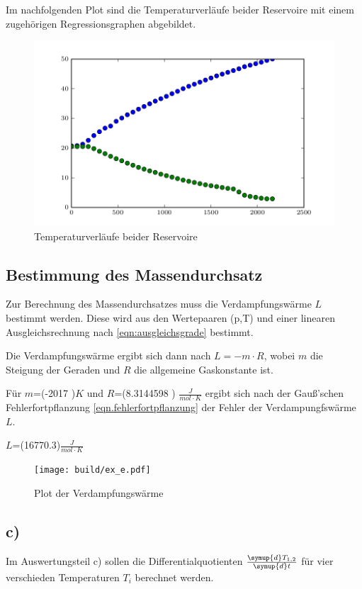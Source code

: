Im nachfolgenden Plot sind die Temperaturverläufe beider Reservoire mit einem zugehörigen Regressionsgraphen abgebildet.

\begin{figure}
  \centering
  \includegraphics{build/plot.pdf}
  \caption{Temperaturverläufe beider Reservoire}
  \label{fig:temperaturverlauf}
\end{figure}



\subsection{Bestimmung des Massendurchsatz}
Zur Berechnung des Massendurchsatzes muss die Verdampfungswärme $L$ bestimmt werden.
Diese wird aus den Wertepaaren (p,T) und einer linearen Ausgleichsrechnung nach \eqref{eqn:ausgleichsgrade} bestimmt.

Die Verdampfungswärme ergibt sich dann nach $ L = −m \cdot R$, wobei $m$ die Steigung der Geraden und $R$ die allgemeine Gaskonstante ist.

Für $m$=(-2017 )$K$ und $R$=(8.3144598 ) $\frac{J}{mol\cdot K}$ \cite{gas}
ergibt sich nach der Gauß’schen Fehlerfortpflanzung \eqref{eqn.fehlerfortpflanzung} der Fehler der Verdampungfswärme $L$.

$L$=(16770.3)$\frac{J}{mol \cdot K}$


\begin{figure}
  \centering
  \texttt{[image: build/ex\_e.pdf]}
  \caption{Plot der Verdampfungswärme}
  \label{fig:verdampfungswaerme}
\end{figure}

\subsection{c)}
Im Auswertungsteil c) sollen die Differentialquotienten $\frac{\symup{d}T_{1,2}}{\symup{d}t}$
für vier verschieden Temperaturen $T_i$ berechnet werden.

